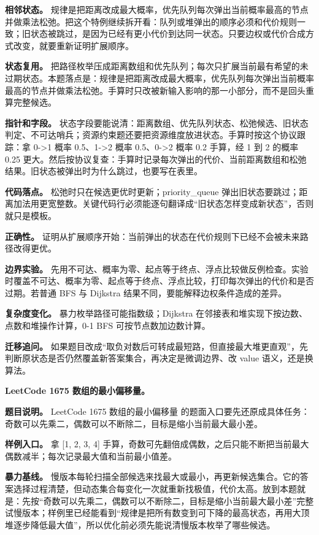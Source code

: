 \textbf{相邻状态。} 规律是把距离改成最大概率，优先队列每次弹出当前概率最高的节点并做乘法松弛。把这个特例继续拆开看：队列或堆弹出的顺序必须和代价规则一致；旧状态被跳过，是因为已经有更小代价到达同一状态。只要边权或代价合成方式改变，就要重新证明扩展顺序。

\textbf{状态复用。} 把路径枚举压成距离数组和优先队列；每次只扩展当前最有希望的未过期状态。本题落点是：规律是把距离改成最大概率，优先队列每次弹出当前概率最高的节点并做乘法松弛。手算时只改被新输入影响的那一小部分，而不是回头重算完整候选。

\textbf{指针和字段。} 状态字段要能说清：距离数组、优先队列状态、松弛候选、旧状态判定、不可达哨兵；资源约束题还要把资源维度放进状态。手算时按这个协议跟踪：拿 0->1 概率 0.5、1->2 概率 0.5、0->2 概率 0.2 手算，经 1 到 2 的概率 0.25 更大。然后按协议复查：手算时记录每次弹出的代价、当前距离数组和松弛结果。旧状态被弹出时为什么跳过，也要写在表里。

\textbf{代码落点。} 松弛时只在候选更优时更新；priority\_queue 弹出旧状态要跳过；距离加法用更宽整数。关键代码行必须能逐句翻译成“旧状态怎样变成新状态”，否则就只是模板。

\textbf{正确性。} 证明从扩展顺序开始：当前弹出的状态在代价规则下已经不会被未来路径改得更优。

\textbf{边界实验。} 先用不可达、概率为零、起点等于终点、浮点比较做反例检查。实验时覆盖不可达、概率为零、起点等于终点、浮点比较，打印每次弹出的代价和是否过期。若普通 BFS 与 Dijkstra 结果不同，要能解释边权条件造成的差异。

\textbf{复杂度变化。} 暴力枚举路径可能指数级；Dijkstra 在邻接表和堆实现下按边数、点数和堆操作计算，0-1 BFS 可按节点数加边数计算。

\textbf{迁移追问。} 如果题目改成“取负对数后可转成最短路，但直接最大堆更直观”，先判断原状态是否仍然覆盖新答案集合，再决定是微调边界、改 value 语义，还是换算法。

\noindent\textbf{LeetCode 1675 数组的最小偏移量。}

\textbf{题目说明。} LeetCode 1675 数组的最小偏移量 的题面入口要先还原成具体任务：奇数可以先乘二，偶数可以不断除二，目标是缩小当前最大最小差。

\textbf{样例入口。} 拿 [1, 2, 3, 4] 手算，奇数可先翻倍成偶数，之后只能不断把当前最大偶数减半；每次记录最大值和当前最小值差。

\textbf{暴力基线。} 慢版本每轮扫描全部候选来找最大或最小，再更新候选集合。它的答案选择过程清楚，但动态集合每变化一次就重新找极值，代价太高。放到本题就是：先按“奇数可以先乘二，偶数可以不断除二，目标是缩小当前最大最小差”完整试慢版本；样例里已经能看到“规律是把所有数变到可下降的最高状态，再用大顶堆逐步降低最大值”，所以优化前必须先能说清慢版本枚举了哪些候选。


